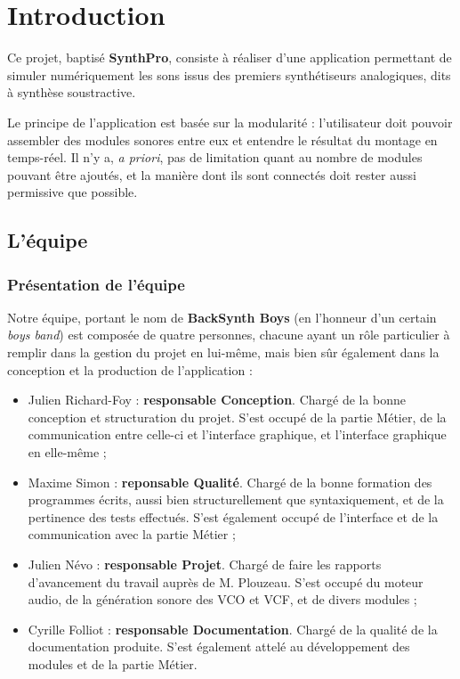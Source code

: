 \section{Introduction}

Ce projet, baptisé \textbf{SynthPro}, consiste à réaliser d'une
application permettant de simuler numériquement les sons issus des
premiers synthétiseurs analogiques, dits à synthèse soustractive.

Le principe de l'application est basée sur la modularité :
l'utilisateur doit pouvoir assembler des modules sonores entre eux
et entendre le résultat du montage en temps-réel. Il n'y a,
\emph{a priori}, pas de limitation quant au nombre de modules
pouvant être ajoutés, et la manière dont ils sont connectés doit
rester aussi permissive que possible.

\subsection{L'équipe}

\subsubsection{Présentation de l'équipe}

Notre équipe, portant le nom de \textbf{BackSynth Boys} (en
l'honneur d'un certain \emph{boys band}) est composée de quatre
personnes, chacune ayant un rôle particulier à remplir dans la
gestion du projet en lui-même, mais bien sûr également dans la
conception et la production de l'application :

\begin{itemize}
\item
  Julien Richard-Foy : \textbf{responsable Conception}. Chargé de la
  bonne conception et structuration du projet. S'est occupé de la
  partie Métier, de la communication entre celle-ci et l'interface
  graphique, et l'interface graphique en elle-même ;
\item
  Maxime Simon : \textbf{reponsable Qualité}. Chargé de la bonne
  formation des programmes écrits, aussi bien structurellement que
  syntaxiquement, et de la pertinence des tests effectués. S'est
  également occupé de l'interface et de la communication avec la
  partie Métier ;
\item
  Julien Névo : \textbf{responsable Projet}. Chargé de faire les
  rapports d'avancement du travail auprès de M. Plouzeau. S'est
  occupé du moteur audio, de la génération sonore des VCO et VCF, et
  de divers modules ;
\item
  Cyrille Folliot : \textbf{responsable Documentation}. Chargé de la
  qualité de la documentation produite. S'est également attelé au
  développement des modules et de la partie Métier.
\end{itemize}
